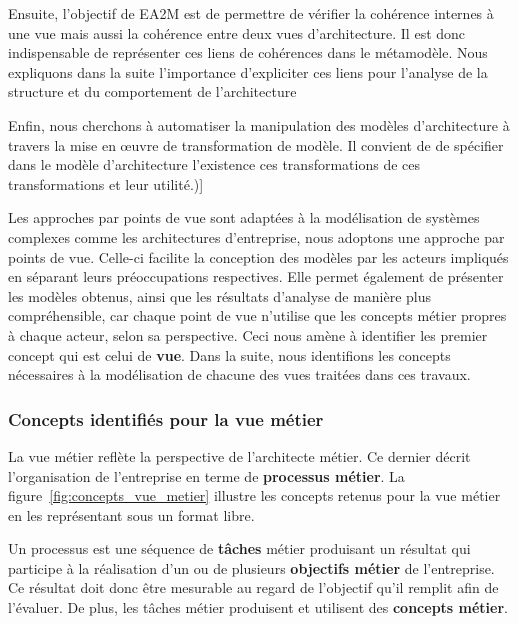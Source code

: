     Ensuite, l’objectif de EA2M est de permettre de vérifier la cohérence internes à une vue mais
    aussi la cohérence entre deux vues d'architecture. Il est donc indispensable de représenter
    ces liens de cohérences dans le métamodèle. Nous expliquons dans la suite l'importance
    d'expliciter ces liens pour l'analyse de la structure et du comportement de l'architecture

    Enfin, nous cherchons à automatiser la manipulation des modèles d'architecture à travers
    la mise en œuvre de transformation de modèle. Il convient de de spécifier dans le modèle
    d'architecture l’existence ces transformations de ces transformations et leur utilité.)]

    Les approches par points de vue sont adaptées à la modélisation
    de systèmes complexes comme les architectures d'entreprise, nous adoptons une
    approche par points de vue. Celle-ci facilite la conception des modèles par les
    acteurs impliqués en séparant leurs préoccupations respectives. Elle permet
    également de présenter les modèles obtenus, ainsi que les résultats d'analyse 
    de manière plus compréhensible, car chaque point de vue
    n'utilise que les concepts métier propres à chaque acteur, selon sa perspective.
    Ceci nous amène à identifier les premier concept qui est celui de \textbf{vue}. 
    Dans la suite, nous identifions les concepts nécessaires à la modélisation de
    chacune des vues traitées dans ces travaux.



    \subsubsection{Concepts identifiés pour la vue métier}

    La vue métier reflète la perspective de l'architecte métier. Ce dernier
    décrit l’organisation de l'entreprise en terme de \textbf{processus métier}.
    La figure~\ref{fig:concepts_vue_metier} illustre les concepts retenus pour la vue
    métier en les représentant sous un format libre.

    Un processus est une séquence
    de \textbf{tâches} métier produisant un résultat qui
    participe à la réalisation d'un ou de plusieurs \textbf{objectifs métier} de l'entreprise.
    Ce résultat doit donc être mesurable au regard de l'objectif qu'il remplit afin de l'évaluer.
    De plus, les tâches métier produisent et utilisent des \textbf{concepts métier}.



